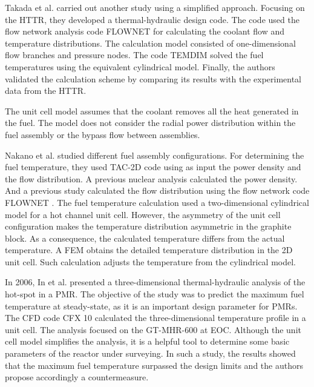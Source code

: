 \documentclass[11pt,letterpaper]{article}
\begin{document}
Takada et al. \cite{takada_core_2004} carried out another study using a simplified approach.
Focusing on the \gls{HTTR}, they developed a thermal-hydraulic design code.
The code used the flow network analysis code FLOWNET for calculating the coolant flow and temperature distributions.
The calculation model consisted of one-dimensional flow branches and pressure nodes.
The code TEMDIM solved the fuel temperatures using the equivalent cylindrical model.
Finally, the authors validated the calculation scheme by comparing its results with the experimental data from the \gls{HTTR}.

The unit cell model assumes that the coolant removes all the heat generated in the fuel.
The model does not consider the radial power distribution within the fuel assembly or the bypass flow between assemblies.

Nakano et al. \cite{nakano_conceptual_2008} studied different fuel assembly configurations.
For determining the fuel temperature, they used TAC-2D code \cite{peterson_tac2d_1969} using as input the power density and the flow distribution.
A previous nuclear analysis calculated the power density.
And a previous study calculated the flow distribution using the flow network code FLOWNET \cite{maruyama_verification_1988}.
The fuel temperature calculation used a two-dimensional cylindrical model for a hot channel unit cell.
However, the asymmetry of the unit cell configuration makes the temperature distribution asymmetric in the graphite block.
As a consequence, the calculated temperature differs from the actual temperature.
A \gls{FEM} obtains the detailed temperature distribution in the 2D unit cell.
Such calculation adjusts the temperature from the cylindrical model.

In 2006, In et al. \cite{in_three-dimensional_2006} presented a three-dimensional thermal-hydraulic analysis of the hot-spot in a \gls{PMR}.
The objective of the study was to predict the maximum fuel temperature at steady-state, as it is an important design parameter for \glspl{PMR}.
The CFD code CFX 10 \cite{ansys_inc_cfx_2006} calculated the three-dimensional temperature profile in a unit cell.
The analysis focused on the GT-MHR-600 at \gls{EOC}.
Although the unit cell model simplifies the analysis, it is a helpful tool to determine some basic parameters of the reactor under surveying.
In such a study, the results showed that the maximum fuel temperature surpassed the design limits and the authors propose accordingly a countermeasure.
\end{document}
